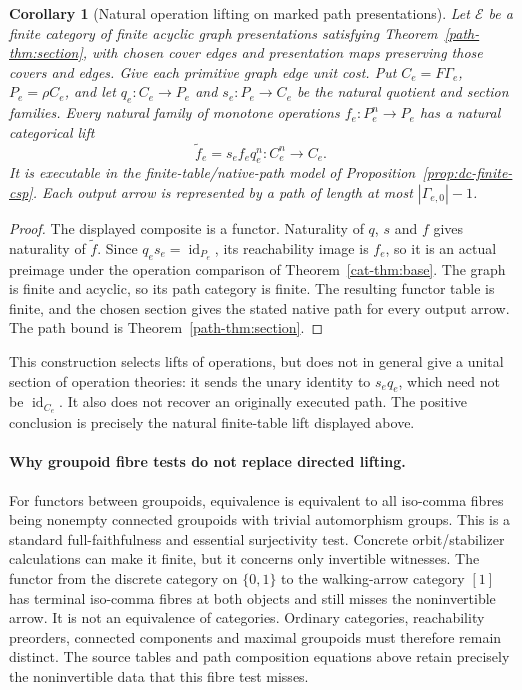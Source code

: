 \documentclass[11pt]{article}
\newtheorem{corollary}[theorem]{Corollary}
\theoremstyle{definition}
\theoremstyle{remark}
\newcommand{\id}{\operatorname{id}}
\begin{document}
\begin{corollary}[Natural operation lifting on marked path presentations]
\label{path-cor:operation-lift}
Let $\mathcal E$ be a finite category of finite acyclic graph presentations
satisfying Theorem~\ref{path-thm:section}, with chosen cover edges and
presentation maps preserving those covers and edges. Give each primitive
graph edge unit cost. Put $C_e=F\Gamma_e$, $P_e=\rho C_e$, and let $q_e:C_e\to P_e$ and
$s_e:P_e\to C_e$ be the natural quotient and section families.
Every natural family of monotone operations $f_e:P_e^n\to P_e$ has a
natural categorical lift
\[
                    \widetilde f_e=s_e f_e q_e^n:C_e^n\to C_e.
\]
It is executable in the finite-table/native-path model of
Proposition~\ref{prop:dc-finite-csp}. Each output arrow is represented by
a path of length at most $|\Gamma_{e,0}|-1$.
\end{corollary}
\begin{proof}
The displayed composite is a functor. Naturality of $q$, $s$ and $f$
gives naturality of $\widetilde f$. Since $q_es_e=\id_{P_e}$,
its reachability image is $f_e$, so it is an actual preimage under the
operation comparison of Theorem~\ref{cat-thm:base}. The graph is finite
and acyclic, so its path category is finite. The resulting functor table
is finite, and the chosen section gives the stated native path for every
output arrow. The path bound is Theorem~\ref{path-thm:section}.
\end{proof}
This construction selects lifts of operations, but does not in general
give a unital section of operation theories: it sends the unary identity
to $s_eq_e$, which need not be $\id_{C_e}$. It also does not recover an
originally executed path. The positive conclusion is precisely the
natural finite-table lift displayed above.

\paragraph{Why groupoid fibre tests do not replace directed lifting.}
For functors between groupoids, equivalence is equivalent to all
iso-comma fibres being nonempty connected groupoids with trivial
automorphism groups. This is a standard full-faithfulness and essential
surjectivity test. Concrete orbit/stabilizer calculations can make it
finite, but it concerns only invertible witnesses. The functor from the
discrete category on $\{0,1\}$ to the walking-arrow category $[1]$ has
terminal iso-comma fibres at both objects and still misses the
noninvertible arrow. It is not an equivalence of categories. Ordinary
categories, reachability preorders, connected components and maximal
groupoids must therefore remain distinct. The source tables and path
composition equations above retain precisely the noninvertible data that
this fibre test misses.
\end{document}
